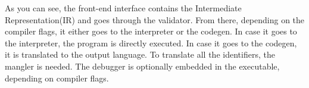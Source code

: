 As you can see, the front-end interface contains the Intermediate Representation(IR) and goes through the validator.
From there, depending on the compiler flags, it either goes to the interpreter or the codegen.
In case it goes to the interpreter, the program is directly executed.
In case it goes to the codegen, it is translated to the output language.
To translate all the identifiers, the mangler is needed.
The debugger is optionally embedded in the executable, depending on compiler flags.

